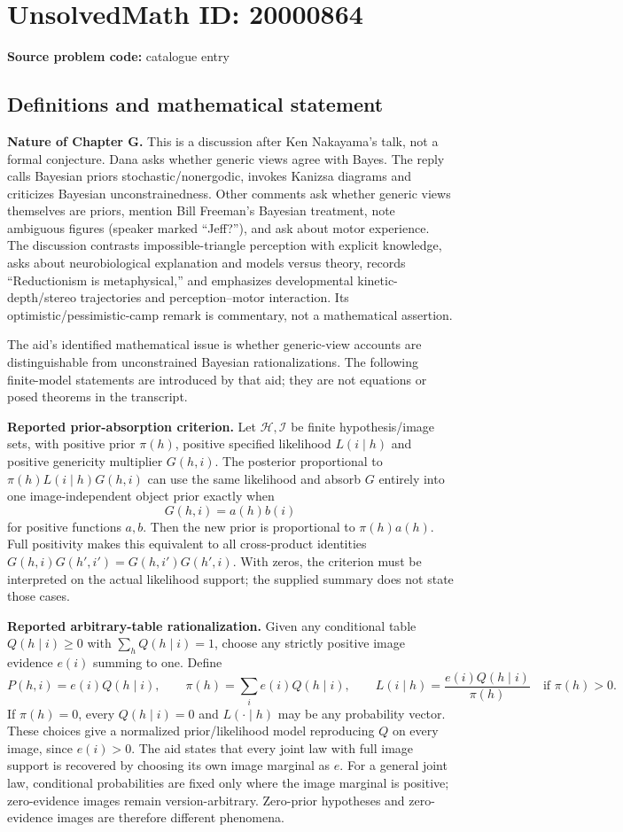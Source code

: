 \documentclass[11pt]{article}
\begin{document}
\section*{UnsolvedMath ID: 20000864}
\textbf{Source problem code:} catalogue entry
\subsection{Definitions and mathematical statement}
\textbf{Nature of Chapter G.} This is a discussion after Ken Nakayama's talk, not a formal conjecture. Dana asks whether generic views agree with Bayes. The reply calls Bayesian priors stochastic/nonergodic, invokes Kanizsa diagrams and criticizes Bayesian unconstrainedness. Other comments ask whether generic views themselves are priors, mention Bill Freeman's Bayesian treatment, note ambiguous figures (speaker marked ``Jeff?''), and ask about motor experience. The discussion contrasts impossible-triangle perception with explicit knowledge, asks about neurobiological explanation and models versus theory, records ``Reductionism is metaphysical,'' and emphasizes developmental kinetic-depth/stereo trajectories and perception--motor interaction. Its optimistic/pessimistic-camp remark is commentary, not a mathematical assertion.

The aid's identified mathematical issue is whether generic-view accounts are distinguishable from unconstrained Bayesian rationalizations. The following finite-model statements are introduced by that aid; they are not equations or posed theorems in the transcript.

\textbf{Reported prior-absorption criterion.} Let $\mathcal H,\mathcal I$ be finite hypothesis/image sets, with positive prior $\pi(h)$, positive specified likelihood $L(i\mid h)$ and positive genericity multiplier $G(h,i)$. The posterior proportional to $\pi(h)L(i\mid h)G(h,i)$ can use the same likelihood and absorb $G$ entirely into one image-independent object prior exactly when
\[
 G(h,i)=a(h)b(i)
\]
for positive functions $a,b$. Then the new prior is proportional to $\pi(h)a(h)$. Full positivity makes this equivalent to all cross-product identities $G(h,i)G(h',i')=G(h,i')G(h',i)$. With zeros, the criterion must be interpreted on the actual likelihood support; the supplied summary does not state those cases.

\textbf{Reported arbitrary-table rationalization.} Given any conditional table $Q(h\mid i)\geq0$ with $\sum_hQ(h\mid i)=1$, choose any strictly positive image evidence $e(i)$ summing to one. Define
\[
 P(h,i)=e(i)Q(h\mid i),\qquad
 \pi(h)=\sum_i e(i)Q(h\mid i),\qquad
 L(i\mid h)=\frac{e(i)Q(h\mid i)}{\pi(h)}\quad\text{if }\pi(h)>0.
\]
If $\pi(h)=0$, every $Q(h\mid i)=0$ and $L(\cdot\mid h)$ may be any probability vector. These choices give a normalized prior/likelihood model reproducing $Q$ on every image, since $e(i)>0$. The aid states that every joint law with full image support is recovered by choosing its own image marginal as $e$. For a general joint law, conditional probabilities are fixed only where the image marginal is positive; zero-evidence images remain version-arbitrary. Zero-prior hypotheses and zero-evidence images are therefore different phenomena.
\end{document}

